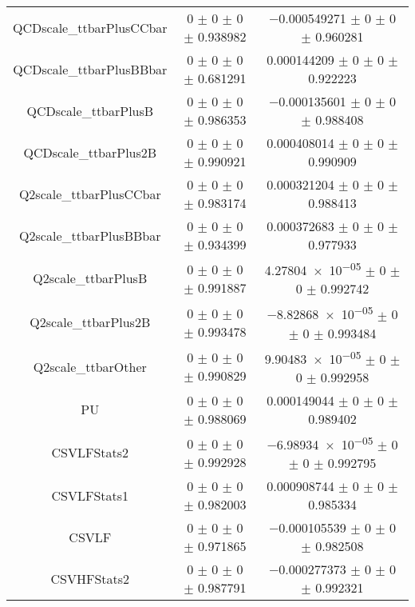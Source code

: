 \begin{table}
\begin{tabular}{ccc}
QCDscale\_ttbarPlusCCbar 	& \num{0} $\pm$ \num{0} $\pm$ \num{0} $\pm$ \num{0.938982} 	& \num{-0.000549271} $\pm$ \num{0} $\pm$ \num{0} $\pm$ \num{0.960281}\\
QCDscale\_ttbarPlusBBbar 	& \num{0} $\pm$ \num{0} $\pm$ \num{0} $\pm$ \num{0.681291} 	& \num{0.000144209} $\pm$ \num{0} $\pm$ \num{0} $\pm$ \num{0.922223}\\
QCDscale\_ttbarPlusB 	& \num{0} $\pm$ \num{0} $\pm$ \num{0} $\pm$ \num{0.986353} 	& \num{-0.000135601} $\pm$ \num{0} $\pm$ \num{0} $\pm$ \num{0.988408}\\
QCDscale\_ttbarPlus2B 	& \num{0} $\pm$ \num{0} $\pm$ \num{0} $\pm$ \num{0.990921} 	& \num{0.000408014} $\pm$ \num{0} $\pm$ \num{0} $\pm$ \num{0.990909}\\
Q2scale\_ttbarPlusCCbar 	& \num{0} $\pm$ \num{0} $\pm$ \num{0} $\pm$ \num{0.983174} 	& \num{0.000321204} $\pm$ \num{0} $\pm$ \num{0} $\pm$ \num{0.988413}\\
Q2scale\_ttbarPlusBBbar 	& \num{0} $\pm$ \num{0} $\pm$ \num{0} $\pm$ \num{0.934399} 	& \num{0.000372683} $\pm$ \num{0} $\pm$ \num{0} $\pm$ \num{0.977933}\\
Q2scale\_ttbarPlusB 	& \num{0} $\pm$ \num{0} $\pm$ \num{0} $\pm$ \num{0.991887} 	& \num{4.27804e-05} $\pm$ \num{0} $\pm$ \num{0} $\pm$ \num{0.992742}\\
Q2scale\_ttbarPlus2B 	& \num{0} $\pm$ \num{0} $\pm$ \num{0} $\pm$ \num{0.993478} 	& \num{-8.82868e-05} $\pm$ \num{0} $\pm$ \num{0} $\pm$ \num{0.993484}\\
Q2scale\_ttbarOther 	& \num{0} $\pm$ \num{0} $\pm$ \num{0} $\pm$ \num{0.990829} 	& \num{9.90483e-05} $\pm$ \num{0} $\pm$ \num{0} $\pm$ \num{0.992958}\\
PU 	& \num{0} $\pm$ \num{0} $\pm$ \num{0} $\pm$ \num{0.988069} 	& \num{0.000149044} $\pm$ \num{0} $\pm$ \num{0} $\pm$ \num{0.989402}\\
CSVLFStats2 	& \num{0} $\pm$ \num{0} $\pm$ \num{0} $\pm$ \num{0.992928} 	& \num{-6.98934e-05} $\pm$ \num{0} $\pm$ \num{0} $\pm$ \num{0.992795}\\
CSVLFStats1 	& \num{0} $\pm$ \num{0} $\pm$ \num{0} $\pm$ \num{0.982003} 	& \num{0.000908744} $\pm$ \num{0} $\pm$ \num{0} $\pm$ \num{0.985334}\\
CSVLF 	& \num{0} $\pm$ \num{0} $\pm$ \num{0} $\pm$ \num{0.971865} 	& \num{-0.000105539} $\pm$ \num{0} $\pm$ \num{0} $\pm$ \num{0.982508}\\
CSVHFStats2 	& \num{0} $\pm$ \num{0} $\pm$ \num{0} $\pm$ \num{0.987791} 	& \num{-0.000277373} $\pm$ \num{0} $\pm$ \num{0} $\pm$ \num{0.992321}\\

\end{tabular}
\end{table}
